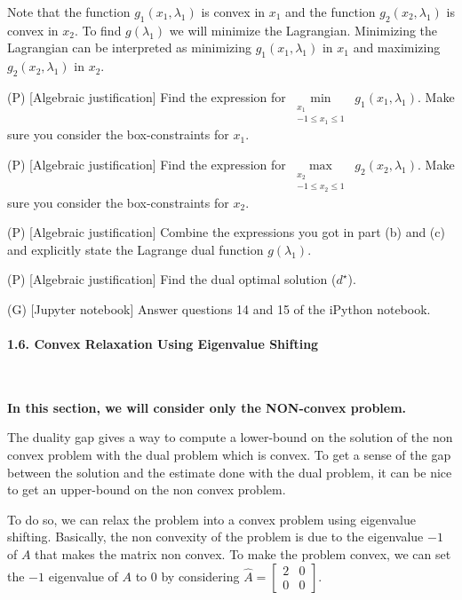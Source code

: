 Note that the function $g_1(x_1,\lambda_1)$ is convex in $x_1$ and the function $g_2(x_2,\lambda_1)$ is convex in $x_2$. To find $g(\lambda_1)$ we will minimize the Lagrangian. Minimizing the Lagrangian can be interpreted as minimizing $g_1(x_1,\lambda_1)$ in $x_1$ and maximizing $g_2(x_2,\lambda_1)$ in $x_2$. 

\begin{enumerate}
    \setcounter{enumi}{1}
    \qitem
    (P) [Algebraic justification] Find the expression for $\min\limits_{\substack{x_1 \\ -1\leq x_1 \leq 1}}\;g_1(x_1,\lambda_1)$. Make sure you consider the box-constraints for $x_1$.
    
    \sol{}
    \qitem
    (P) [Algebraic justification] Find the expression for $\max\limits_{\substack{x_2 \\ -1\leq x_2 \leq 1}}\;g_2(x_2,\lambda_1)$. Make sure you consider the box-constraints for $x_2$.
    
    \sol{}
    \qitem
    (P) [Algebraic justification] Combine the expressions you got in part (b) and (c) and explicitly state the Lagrange dual function $g(\lambda_1)$.
    
    \sol{}
    \qitem
    (P) [Algebraic justification] Find the dual optimal solution ($d^\star$).
    
    \sol{}
    
    \qitem (G) [Jupyter notebook] Answer questions 14 and 15 of the iPython notebook.
    
    \sol{}
\end{enumerate}

\paragraph{1.6. Convex Relaxation Using Eigenvalue Shifting}\

\textbf{In this section, we will consider only the NON-convex problem.}

The duality gap gives a way to compute a lower-bound on the solution of the non convex problem with the dual problem which is convex.
To get a sense of the gap between the solution and the estimate done with the dual problem, it can be nice to get an upper-bound on the non convex problem.

To do so, we can relax the problem into a convex problem using eigenvalue shifting.
Basically, the non convexity of the problem is due to the eigenvalue $-1$ of $A$ that makes the matrix non convex.
To make the problem convex, we can set the $-1$ eigenvalue of $A$ to $0$ by considering $\hat{A}=\begin{bmatrix} 2 & 0 \\ 0 & 0\end{bmatrix}$.

